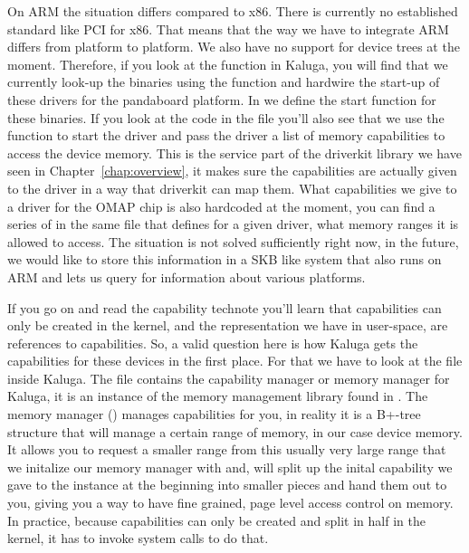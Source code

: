 \documentclass[a4paper,11pt,twoside]{report}
\begin{document}
On ARM the situation differs compared to x86. There is currently no
established standard like PCI for x86. That means that the way we have to
integrate ARM differs from platform to platform. We also have no support for
device trees at the moment. Therefore, if you look at the 
function in Kaluga, you will find that we currently look-up the binaries using
the  function and hardwire the start-up of these drivers
for the pandaboard platform. In  we define the start
function for these binaries. If you look at the code in the file you'll also
see that we use the function  to start the
driver and pass the driver a list of memory capabilities to access the device
memory. This is the service part of the driverkit library we have seen in
Chapter~\ref{chap:overview}, it makes sure the capabilities are actually given
to the driver in a way that driverkit can map them. What capabilities we give
to a driver for the OMAP chip is also hardcoded at the moment, you can find a
series of  in the same file that defines for a
given driver, what memory ranges it is allowed to access. The situation is not
solved sufficiently right now, in the future, we would like to store this
information in a SKB like system that also runs on ARM and lets us query for
information about various platforms.

If you go on and read the capability technote \cite{btn013-capabilities}
you'll learn that capabilities can only be created in the kernel, and the
representation we have in user-space, are references to capabilities. So, a
valid question here is how Kaluga gets the capabilities for these devices in
the first place. For that we have to look at the  file
inside Kaluga. The file contains the capability manager or memory manager for
Kaluga, it is an instance of the memory management library found in
. The memory manager () manages capabilities
for you, in reality it is a B+-tree structure that will manage a certain range
of memory, in our case device memory. It allows you to request a smaller range
from this usually very large range that we initalize our memory manager with
and,  will split up the inital capability we gave to the
instance at the beginning into smaller pieces and hand them out to you, giving
you a way to have fine grained, page level access control on memory. In
practice, because capabilities can only be created and split in half in the
kernel, it has to invoke system calls to do that.
\end{document}
